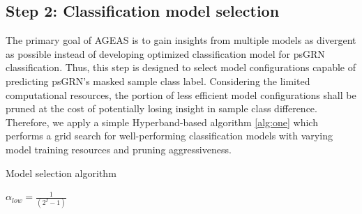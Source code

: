 \documentclass[fleqn,10pt]{wlscirep}
\begin{document}
  \subsection*{Step 2: Classification model selection}
    \label{step2}
    The primary goal of AGEAS is to gain insights from multiple models as divergent as possible instead of developing optimized classification model for psGRN classification.
    Thus, this step is designed to select model configurations capable of predicting psGRN's masked sample class label.
    Considering the limited computational resources, the portion of less efficient model configurations shall be pruned at the cost of potentially losing insight in sample class difference.
    Therefore, we apply a simple Hyperband\cite{hyperband}-based algorithm \ref{alg:one} which performs a grid search for well-performing classification models with varying model training resources and pruning aggressiveness.


    \begin{algorithm}
    \caption{Model selection algorithm}
    \label{alg:one}
    $\alpha_{low} = \frac{1}{(2 ^ {I} - 1)}$\;
    \end{algorithm}
\end{document}
